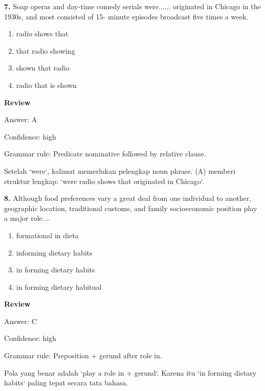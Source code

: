 \documentclass[12pt]{article}
\begin{document}
\vspace{0.25\baselineskip}
\noindent\textbf{7.} Soap operas and day-time comedy serials were...... originated in Chicago in the 1930s, and most consisted of 15- minute episodes broadcast five times a week.
\begin{enumerate}[label=(\Alph*),leftmargin=*,itemsep=0.2em]
\item radio shows that
\item that radio showing
\item shown that radio
\item radio that is shown
\end{enumerate}
\par
\begingroup
\setlength{\parskip}{0pt}
\setlength{\parindent}{0pt}
\textbf{Review}\par
Answer: A\par
Confidence: high\par
Grammar rule: Predicate nominative followed by relative clause.\par
Setelah `were`, kalimat memerlukan pelengkap noun phrase. (A) memberi struktur lengkap: `were radio shows that originated in Chicago`.\par
\endgroup
\par
\vspace{0.25\baselineskip}
\noindent\textbf{8.} Although food preferences vary a great deal from one individual to another, geographic location, traditional customs, and family socioeconomic position play a major role....
\begin{enumerate}[label=(\Alph*),leftmargin=*,itemsep=0.2em]
\item formational in dieta
\item informing dietary habits
\item in forming dietary habits
\item in forming dietary habitual
\end{enumerate}
\par
\begingroup
\setlength{\parskip}{0pt}
\setlength{\parindent}{0pt}
\textbf{Review}\par
Answer: C\par
Confidence: high\par
Grammar rule: Preposition + gerund after role in.\par
Pola yang benar adalah `play a role in + gerund`. Karena itu `in forming dietary habits` paling tepat secara tata bahasa.\par
\endgroup
\par
\vspace{0.25\baselineskip}
\end{document}
